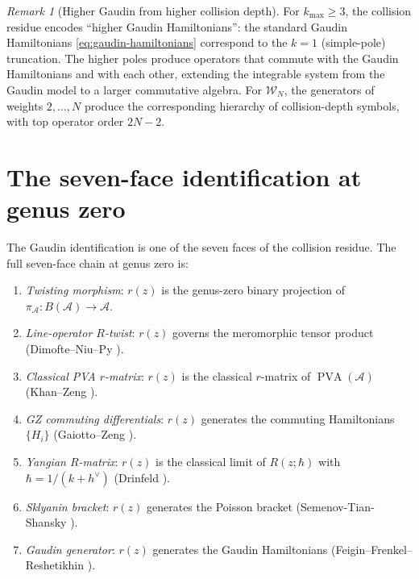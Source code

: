 \documentclass[11pt]{article}
\theoremstyle{plain}
\theoremstyle{definition}
\theoremstyle{remark}
\newtheorem{remark}[theorem]{Remark}
\newcommand{\cA}{\mathcal{A}}
\newcommand{\cW}{\mathcal{W}}
\numberwithin{equation}{section}
\begin{document}
\begin{remark}[Higher Gaudin from higher collision depth]
\label{rem:higher-gaudin}
For $k_{\max} \geq 3$, the collision residue encodes ``higher Gaudin
Hamiltonians'': the standard Gaudin Hamiltonians
\eqref{eq:gaudin-hamiltonians} correspond to the $k = 1$
(simple-pole) truncation. The higher poles produce operators that
commute with the Gaudin Hamiltonians and with each other, extending
the integrable system from the Gaudin model to a larger commutative
algebra. For $\cW_N$, the generators of weights \(2,\ldots,N\)
produce the corresponding hierarchy of collision-depth symbols, with
top operator order \(2N-2\).
\end{remark}

\section{The seven-face identification at genus zero}
\label{sec:seven-face}

The Gaudin identification is one of the seven faces of the collision
residue. The full seven-face chain at genus zero is:

\begin{enumerate}[label=\textbf{(F\arabic*)}]
 \item \emph{Twisting morphism}: $r(z)$ is the genus-zero binary
 projection of $\pi_\cA \colon B(\cA) \to \cA$.
 \item \emph{Line-operator $R$-twist}: $r(z)$ governs the
 meromorphic tensor product (Dimofte--Niu--Py \cite{DNP25}).
 \item \emph{Classical PVA $r$-matrix}: $r(z)$ is the classical
 $r$-matrix of $\operatorname{PVA}(\cA)$ (Khan--Zeng \cite{KZ25}).
 \item \emph{GZ commuting differentials}: $r(z)$ generates the
 commuting Hamiltonians $\{H_i\}$ (Gaiotto--Zeng \cite{GZ26}).
 \item \emph{Yangian $R$-matrix}: $r(z)$ is the classical limit
 of $R(z;\hbar)$ with $\hbar = 1/(k+h^\vee)$
 (Drinfeld \cite{Drinfeld1985}).
 \item \emph{Sklyanin bracket}: $r(z)$ generates the Poisson
 bracket (Semenov-Tian-Shansky \cite{STS1983}).
 \item \emph{Gaudin generator}: $r(z)$ generates the Gaudin
 Hamiltonians (Feigin--Frenkel--Reshetikhin \cite{FFR1994}).
\end{enumerate}
\end{document}
